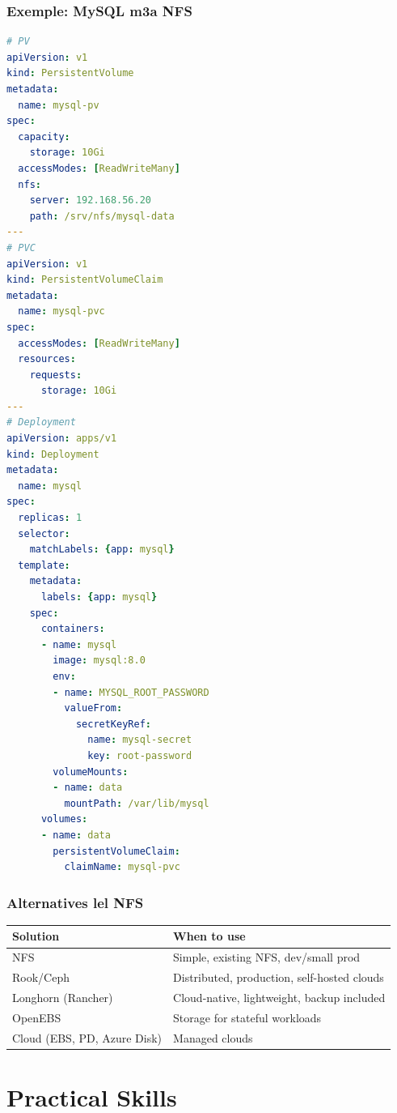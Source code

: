 \documentclass[11pt,a4paper]{book}
\begin{document}
\section{Exemple: MySQL m3a NFS}

\begin{lstlisting}[language=yaml]
# PV
apiVersion: v1
kind: PersistentVolume
metadata:
  name: mysql-pv
spec:
  capacity:
    storage: 10Gi
  accessModes: [ReadWriteMany]
  nfs:
    server: 192.168.56.20
    path: /srv/nfs/mysql-data
---
# PVC
apiVersion: v1
kind: PersistentVolumeClaim
metadata:
  name: mysql-pvc
spec:
  accessModes: [ReadWriteMany]
  resources:
    requests:
      storage: 10Gi
---
# Deployment
apiVersion: apps/v1
kind: Deployment
metadata:
  name: mysql
spec:
  replicas: 1
  selector:
    matchLabels: {app: mysql}
  template:
    metadata:
      labels: {app: mysql}
    spec:
      containers:
      - name: mysql
        image: mysql:8.0
        env:
        - name: MYSQL_ROOT_PASSWORD
          valueFrom:
            secretKeyRef:
              name: mysql-secret
              key: root-password
        volumeMounts:
        - name: data
          mountPath: /var/lib/mysql
      volumes:
      - name: data
        persistentVolumeClaim:
          claimName: mysql-pvc
\end{lstlisting}

\section{Alternatives lel NFS}

\begin{longtable}{L{3cm}L{9cm}}
\toprule
\textbf{Solution} & \textbf{When to use} \\
\midrule
NFS & Simple, existing NFS, dev/small prod \\
Rook/Ceph & Distributed, production, self-hosted clouds \\
Longhorn (Rancher) & Cloud-native, lightweight, backup included \\
OpenEBS & Storage for stateful workloads \\
Cloud (EBS, PD, Azure Disk) & Managed clouds \\
\bottomrule
\end{longtable}

\cleardoublepage

\part{Practical Skills}
\end{document}

